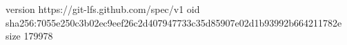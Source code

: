 version https://git-lfs.github.com/spec/v1
oid sha256:7055e250c3b02ec9eef26c2d407947733c35d85907e02d1b93992b664211782e
size 179978
